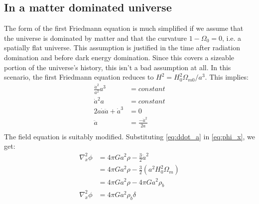 \documentclass[12pt,a4paper,oneside]{book}
\begin{document}
		\subsection{In a matter dominated universe}
			The form of the first Friedmann equation is much simplified if we assume that the universe is dominated by matter and that the curvature $1-\Omega_0=0$, i.e. a spatially flat universe. This assumption is justified in the time after radiation domination and before dark energy domination. Since this covers a sizeable portion of the universe's history, this isn't a bad assumption at all. In this scenario, the first Friedmann equation reduces to $H^2=H_0^2\Omega_{m0}/{a^3}$. This implies:
			\begin{equation}
				\begin{aligned}
					\frac{\dot{a}^2}{a^2}a^3&=constant\\
					\dot{a}^2a&=constant\\
					2a\dot{a}\ddot{a}+\dot{a}^3&=0\\
					\ddot{a}&=\frac{-\dot{a}^2}{2a}\\
				\end{aligned}
				\label{eq:ddot_a}
			\end{equation}
			The field equation is suitably modified. Substituting \ref{eq:ddot_a} in \ref{eq:phi_x}, we get:
			\begin{equation}
				\begin{aligned}
					\nabla_x^2\phi&=4\pi G a^2\rho -\frac{3}{2}\dot{a}^2\\
											   &=4\pi G a^2\rho- \frac{3}{2}\left(a^2H_0^2\Omega_m\right)\\
												&=4\pi Ga^2\rho-4\pi Ga^2\rho_b\\
					\nabla_x^2\phi&=4\pi G a^2\rho_b\delta\\
				\end{aligned}
				\label{eq:perturb-poisson}
			\end{equation}
\end{document}
